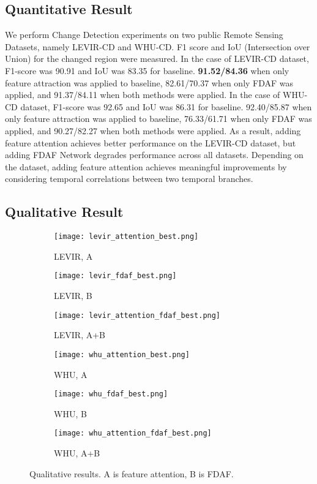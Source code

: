 \documentclass[../main.tex]{subfiles}
\begin{document}
\subsection{Quantitative Result}
We perform Change Detection experiments on two public Remote Sensing Datasets, namely LEVIR-CD\cite{LEVIR-CD} and WHU-CD\cite{WHU-CD}. F1 score and IoU (Intersection over Union) for the changed region were measured. In the case of LEVIR-CD dataset, F1-score was 90.91 and IoU was 83.35 for baseline. \textbf{91.52/84.36} when only feature attraction was applied to baseline, 82.61/70.37 when only FDAF was applied, and 91.37/84.11 when both methods were applied. In the case of WHU-CD dataset, F1-score was 92.65 and IoU was 86.31 for baseline. 92.40/85.87 when only feature attraction was applied to baseline, 76.33/61.71 when only FDAF was applied, and 90.27/82.27 when both methods were applied.
As a result, adding feature attention achieves better performance on the LEVIR-CD dataset, but  adding FDAF Network degrades performance across all datasets. Depending on the dataset, adding feature attention achieves meaningful improvements by considering temporal correlations between two temporal branches.




\subsection{Qualitative Result}
\begin{figure}[h]
    \centering
    \begin{subfigure}[b]{0.16\linewidth}
        \texttt{[image: levir\_attention\_best.png]}
        \caption{LEVIR, A}
    \end{subfigure}
    \begin{subfigure}[b]{0.16\linewidth}
        \texttt{[image: levir\_fdaf\_best.png]}
        \caption{LEVIR, B}
    \end{subfigure}
    \begin{subfigure}[b]{0.16\linewidth}
        \texttt{[image: levir\_attention\_fdaf\_best.png]}
        \caption{LEVIR, A+B}
    \end{subfigure}
    \begin{subfigure}[b]{0.16\linewidth}
        \texttt{[image: whu\_attention\_best.png]}
        \caption{WHU, A}
    \end{subfigure}
    \begin{subfigure}[b]{0.16\linewidth}
        \texttt{[image: whu\_fdaf\_best.png]}
        \caption{WHU, B}
    \end{subfigure}
    \begin{subfigure}[b]{0.16\linewidth}
        \texttt{[image: whu\_attention\_fdaf\_best.png]}
        \caption{WHU, A+B}
    \end{subfigure}
    \caption{Qualitative results. A is feature attention, B is FDAF.}
    \label{fig:qualitative_results}
\end{figure}
\end{document}
